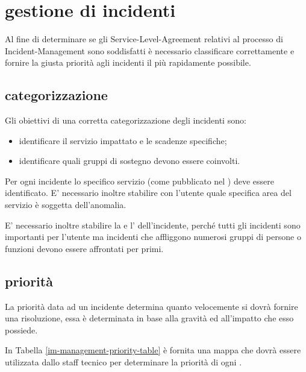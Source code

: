 %
%
\section[Gestione di incidenti]{gestione di incidenti}
\label{im-management}
Al fine di determinare se gli \ac{Service-Level-Agreement} relativi al processo di \ac{Incident-Management} sono soddisfatti è necessario classificare correttamente e fornire la giusta priorità agli incidenti il più rapidamente possibile.

\subsection[Categorizzazione]{categorizzazione}
\label{im-management-categorization}
Gli obiettivi di una corretta categorizzazione degli incidenti sono:

\begin{itemize}
\item{identificare il servizio impattato e le scadenze specifiche;}
\item{identificare quali gruppi di sostegno devono essere coinvolti.}
\end{itemize}

Per ogni incidente lo specifico servizio (come pubblicato nel ) deve essere identificato. E' necessario inoltre stabilire con l'utente quale specifica area del servizio è soggetta dell'anomalia.

E' necessario inoltre stabilire la  e l' dell'incidente, perché tutti gli incidenti sono importanti per l'utente ma incidenti che affliggono numerosi gruppi di persone o funzioni  devono essere affrontati per primi.

\subsection[Priorità]{priorità}
\label{im-management-priority}
La priorità data ad un incidente determina quanto velocemente si dovrà fornire una risoluzione, essa è determinata in base alla gravità ed all'impatto che esso possiede.

In Tabella \ref{im-management-priority-table} è fornita una mappa che dovrà essere utilizzata dallo staff tecnico per determinare la priorità di ogni .

